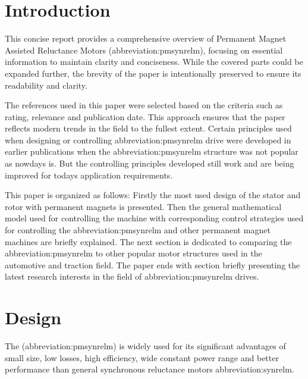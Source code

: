 \documentclass[a4paper, twoside, 11pt]{article}
\begin{document}
\section{Introduction}
This concise report provides a comprehensive overview of Permanent Magnet Assisted Reluctance Motors (\gls{abbreviation:pmsynrelm}),  focusing on essential information to maintain clarity and conciseness. While the covered parts could be expanded further, the brevity of the paper is intentionally preserved to ensure its readability and clarity.\par
The references used in this paper were selected based on the criteria such as rating, relevance and publication date. This approach ensures that the paper reflects modern trends in the field to the fullest extent. Certain principles used when designing or controlling \gls{abbreviation:pmsynrelm} drive were developed in earlier publications when the \gls{abbreviation:pmsynrelm} structure was not popular as nowdays is. But the controlling principles developed still work and are being improved for todays application requirements.\par
This paper is organized as follows: Firstly the most used design of the stator and rotor with permanent magnets is presented. Then the general mathematical model used for controlling the machine with corresponding control strategies used for controlling the \gls{abbreviation:pmsynrelm} and other permanent magnet machines are briefly explained. The next section is dedicated to comparing the \gls{abbreviation:pmsynrelm} to other popular motor structures used in the automotive and traction field. The paper ends with section briefly presenting the latest research interests in the field of \gls{abbreviation:pmsynrelm} drives.

\section{Design}
The (\gls{abbreviation:pmsynrelm}) is widely used for its significant advantages of small size, low losses, high efficiency, wide constant power range and better performance than general synchronous reluctance motors \gls{abbreviation:synrelm}. \cite{xinmin-design-of-permanent-magnet-assisted-synch-rel-m-with-low-torque-ripple,huynh-design-and-analysis-of-perm-as-synch-rel-m}
\end{document}
